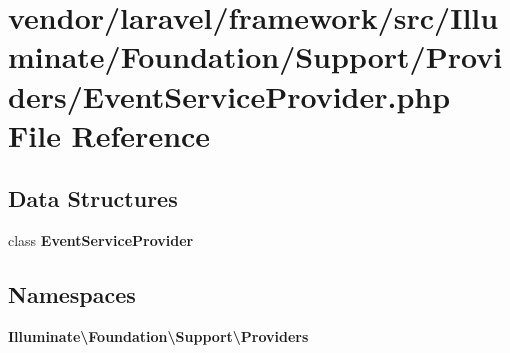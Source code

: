 \section{vendor/laravel/framework/src/\+Illuminate/\+Foundation/\+Support/\+Providers/\+Event\+Service\+Provider.php File Reference}
\label{vendor_2laravel_2framework_2src_2_illuminate_2_foundation_2_support_2_providers_2_event_service_provider_8php}
\subsection*{Data Structures}
\begin{DoxyCompactItemize}
\item 
class {\bf Event\+Service\+Provider}
\end{DoxyCompactItemize}
\subsection*{Namespaces}
\begin{DoxyCompactItemize}
\item 
 {\bf Illuminate\textbackslash{}\+Foundation\textbackslash{}\+Support\textbackslash{}\+Providers}
\end{DoxyCompactItemize}
